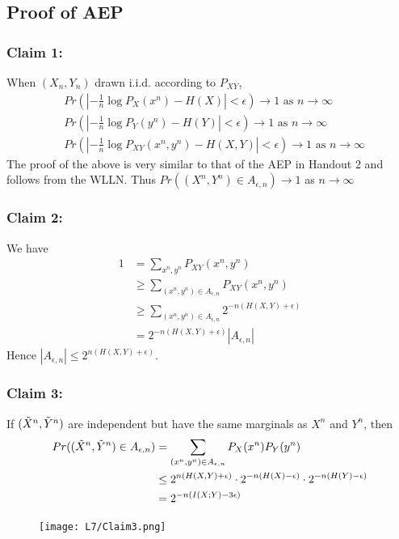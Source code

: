 \documentclass[12pt]{article}
\begin{document}
\subsection{Proof of AEP}
\subsubsection{Claim 1:}
When $(X_n,Y_n)$ drawn i.i.d. according to $P_{XY}$,
\begin{align*}
    &Pr\left(|- \frac{1}{n} \log P_X(x^n)-H(X)| < \epsilon \right) \rightarrow 1 \textrm{ as } n\rightarrow\infty\\
    &Pr\left(|- \frac{1}{n} \log P_Y(y^n)-H(Y)| < \epsilon \right) \rightarrow 1 \textrm{ as } n\rightarrow\infty\\
    &Pr\left(|- \frac{1}{n} \log P_{XY}(x^n,y^n)-H(X,Y)| < \epsilon \right) \rightarrow 1 \textrm{ as } n\rightarrow\infty 
\end{align*}
The proof of the above is very similar to that of the AEP in Handout 2 and follows from the WLLN. Thus $Pr((X^n,Y^n)\in A_{\epsilon ,n}) \rightarrow 1$ as $n\rightarrow \infty$
\subsubsection{Claim 2:}
We have 
\begin{align*}
    1 &= \sum_{x^n,y^n}P_{XY}(x^n,y^n)\\
    &\ge \sum_{(x^n,y^n)\in A_{\epsilon ,n}}P_{XY}(x^n,y^n)\\
    & \ge \sum_{(x^n,y^n)\in A_{\epsilon ,n}} 2^{-n(H(X,Y)+\epsilon)}\\
    & = 2^{-n(H(X,Y)+\epsilon)}|A_{\epsilon,n}|
\end{align*}
Hence $|A_{\epsilon,n}| \le 2^{n(H(X,Y)+\epsilon)}$. 

\subsubsection{Claim 3:}
If $(\Tilde{X}^n,\Tilde{Y}^n)$ are independent but have the same marginals as $X^n$ and $Y^n$, then 
\begin{align*}
    Pr((\Tilde{X}^n,\Tilde{Y}^n)\in A_{\epsilon ,n}) &= \sum_{(x^n,y^n)\in A_{\epsilon ,n}}P_X(x^n)P_Y(y^n) \\
    &\le 2^{n(H(X,Y)+\epsilon)} \cdot 2^{-n(H(X)-\epsilon)} \cdot 2^{-n(H(Y)-\epsilon)} \\
    &= 2^{-n(I(X;Y)-3\epsilon)}
\end{align*}
\begin{figure}[H]
    \centering
    \texttt{[image: L7/Claim3.png]}
\end{figure}
\end{document}
